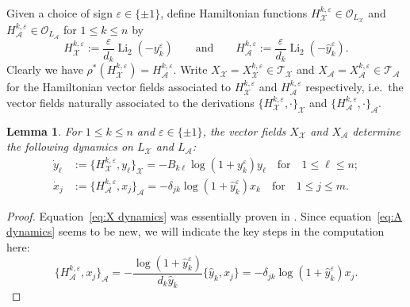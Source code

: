 \documentclass{amsart}
\newtheorem{lemma}[theorem]{Lemma}
\numberwithin{equation}{section}
\newcommand{\cA}{\mathcal{A}}
\newcommand{\cO}{\mathcal{O}}
\newcommand{\cX}{\mathcal{X}}
\newcommand{\cT}{\mathcal{T}}
\newcommand{\Li}{\operatorname{Li}}
\begin{document}
Given a choice of sign $\varepsilon\in\{\pm1\}$, define Hamiltonian functions $H^{k,\varepsilon}_\cX\in\cO_{L_\cX}$ and $H^{k,\varepsilon}_\cA\in\cO_{L_\cA}$ for $1\le k\le n$ by
\begin{equation}
  \label{eq:hamiltonians}
  H_\cX^{k,\varepsilon}:=\frac{\varepsilon}{d_k}\Li_2(-y_k^\varepsilon)\qquad\text{and}\qquad H_\cA^{k,\varepsilon}:=\frac{\varepsilon}{d_k}\Li_2(-\hat y_k^\varepsilon).
\end{equation}
Clearly we have $\rho^*(H_\cX^{k,\varepsilon})=H_\cA^{k,\varepsilon}$.
Write $X_\cX=X_\cX^{k,\varepsilon}\in\cT_\cX$ and $X_\cA=X_\cA^{k,\varepsilon}\in\cT_\cA$ for the Hamiltonian vector fields associated to $H_\cX^{k,\varepsilon}$ and $H_\cA^{k,\varepsilon}$ respectively, i.e.\ the vector fields naturally associated to the derivations $\{H_\cX^{k,\varepsilon},\cdot\}_\cX$ and $\{H_\cA^{k,\varepsilon},\cdot\}_\cA$.
\begin{lemma}
  \label{le:hamiltonian dynamics}
  For $1\le k\le n$ and $\varepsilon\in\{\pm1\}$, the vector fields $X_\cX$ and $X_\cA$ determine the following dynamics on $L_\cX$ and $L_\cA$:
  \begin{align}
    \label{eq:X dynamics}
    \dot y_\ell&:=\{H_\cX^{k,\varepsilon},y_\ell\}_\cX=-B_{k\ell}\log(1+y_k^\varepsilon)y_\ell\quad\text{for}\quad 1\le\ell\le n;\\
    \label{eq:A dynamics}
    \dot x_j&:=\{H_\cA^{k,\varepsilon},x_j\}_\cA=-\delta_{jk}\log(1+\hat y_k^\varepsilon)x_k\quad\text{for}\quad 1\le j\le m.
  \end{align}
\end{lemma}
\begin{proof}
  Equation~\eqref{eq:X dynamics} was essentially proven in \cite{MR3691969}.
  Since equation~\eqref{eq:A dynamics} seems to be new, we will indicate the key steps in the computation here:
  \[\{H_\cA^{k,\varepsilon},x_j\}_\cA=-\frac{\log(1+\hat y_k^\varepsilon)}{d_k\hat y_k}\{\hat y_k,x_j\}=-\delta_{jk}\log(1+\hat y_k^\varepsilon)x_j.\]
\end{proof}
\end{document}
